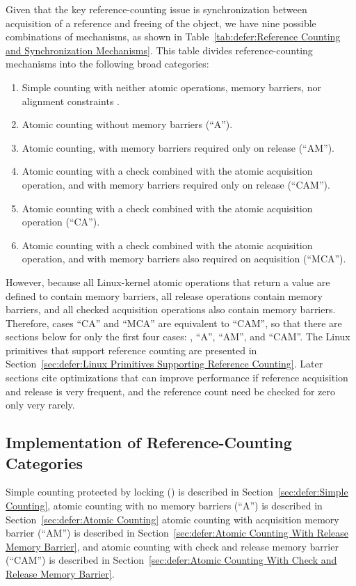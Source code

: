 Given that the key reference-counting issue
is synchronization between acquisition
of a reference and freeing of the object, we have nine possible
combinations of mechanisms, as shown in
Table~\ref{tab:defer:Reference Counting and Synchronization Mechanisms}.
This table
divides reference-counting mechanisms into the following broad categories:
\begin{enumerate}
\item	Simple counting with neither atomic operations, memory
	barriers, nor alignment constraints .
\item	Atomic counting without memory barriers (``A'').
\item	Atomic counting, with memory barriers required only on release
	(``AM'').
\item	Atomic counting with a check combined with the atomic acquisition
	operation, and with memory barriers required only on release
	(``CAM'').
\item	Atomic counting with a check combined with the atomic acquisition
	operation (``CA'').
\item	Atomic counting with a check combined with the atomic acquisition
	operation, and with memory barriers also required on acquisition
	(``MCA'').
\end{enumerate}
However, because all Linux-kernel atomic operations that return a
value are defined to contain memory barriers, all release operations
contain memory barriers, and all checked acquisition operations also
contain memory barriers.
Therefore, cases ``CA'' and ``MCA'' are equivalent to ``CAM'', so that
there are sections below for only the first four cases:
, ``A'', ``AM'', and ``CAM''.
The Linux primitives that support reference counting are presented in
Section~\ref{sec:defer:Linux Primitives Supporting Reference Counting}.
Later sections cite optimizations that can improve performance
if reference acquisition and release is very frequent, and the
reference count need be checked for zero only very rarely.

\subsection{Implementation of Reference-Counting Categories}
\label{sec:defer:Implementation of Reference-Counting Categories}

Simple counting protected by locking () is described in
Section~\ref{sec:defer:Simple Counting},
atomic counting with no memory barriers (``A'') is described in
Section~\ref{sec:defer:Atomic Counting}
atomic counting with acquisition memory barrier (``AM'') is described in
Section~\ref{sec:defer:Atomic Counting With Release Memory Barrier},
and 
atomic counting with check and release memory barrier (``CAM'') is described in
Section~\ref{sec:defer:Atomic Counting With Check and Release Memory Barrier}.

